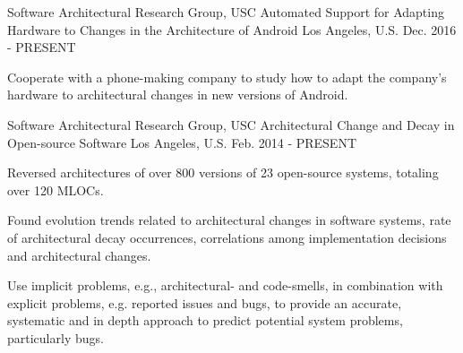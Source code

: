 \vspace{-1mm}

\begin{cventries}

  \cventry
    {{Software Architectural Research Group}, USC } %
    {Automated Support for Adapting Hardware to Changes in the Architecture of Android} %
    {Los Angeles, U.S.} %
    {Dec. 2016 - PRESENT} %
    {
      \begin{cvitems} %
        \item Cooperate with a phone-making company to study how to adapt the company's hardware to architectural changes in new versions of Android.
      \end{cvitems}
    }




  \cventry
    {{Software Architectural Research Group}, USC} %
    {Architectural Change and Decay in Open-source Software} %
    {Los Angeles, U.S.} %
    {Feb. 2014 - PRESENT} %
    {
      \begin{cvitems} %
        \item Reversed architectures of over 800 versions of 23 open-source systems, totaling over 120 MLOCs.
        \item Found evolution trends related to architectural changes in software systems, rate of architectural decay occurrences, correlations among implementation decisions and architectural changes.
        \item Use implicit problems, e.g.,
        architectural- and code-smells, in combination with explicit problems, e.g. reported issues and bugs, to provide an accurate, systematic and in depth approach to predict potential system problems, particularly bugs.
      \end{cvitems}
    }
   

\end{cventries}
